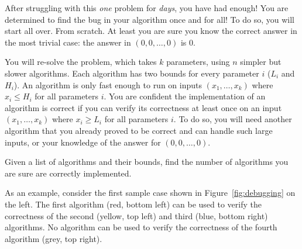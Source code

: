

\newcommand{\maxk}{10}
\newcommand{\maxn}{1000}
\newcommand{\maxc}{10^9}

After struggling with this \emph{one} problem for \emph{days}, you have had
enough! You are determined to find the bug in your algorithm once and for all!
To do so, you will start all over. From scratch. At least you are sure you know
the correct answer in the most trivial case: the answer in $(0,0, \dots, 0)$
is $0$.

You will re-solve the problem, which takes $k$ parameters,
using $n$ simpler but slower algorithms.
Each algorithm has two bounds for every parameter $i$ ($L_i$ and $H_i$).
An algorithm is only fast enough to run on inputs
$(x_1, \dots, x_k)$ where $x_i \leq H_i$ for all parameters $i$.
You are confident the implementation of an algorithm
is correct if you can verify its correctness at least once on an input
$(x_1, \dots, x_k)$ where $x_i \geq L_i$ for all parameters $i$.
To do so, you will need another algorithm
that you already proved to be correct and can handle such large inputs,
or your knowledge of the answer for $(0,0, \dots, 0)$.

Given a list of algorithms and their bounds,
find the number of algorithms you are sure are correctly implemented.

As an example, consider the first sample case shown in
Figure~\ref{fig:debugging} on the left.
The first algorithm (red, bottom left) can be used to verify the
correctness of the second (yellow, top left) and third (blue, bottom right) algorithms. No algorithm
can be used to verify the correctness of the fourth algorithm (grey, top right).

